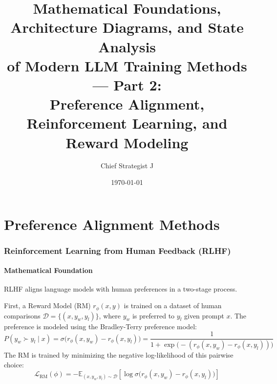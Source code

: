 
\title{\textbf{Mathematical Foundations, Architecture Diagrams, and State Analysis\\
of Modern LLM Training Methods --- Part 2:\\
Preference Alignment, Reinforcement Learning, and Reward Modeling}}
\author{Chief Strategist J}
\date{\today}
\maketitle
\tableofcontents
\newpage

\part{Preference Alignment Methods}

\section{Reinforcement Learning from Human Feedback (RLHF)}

\subsection{Mathematical Foundation}
RLHF aligns language models with human preferences in a two-stage process. 

First, a Reward Model (RM) $r_\phi(x, y)$ is trained on a dataset of human comparisons $\mathcal{D} = \{(x, y_w, y_l)\}$, where $y_w$ is preferred to $y_l$ given prompt $x$. The preference is modeled using the Bradley-Terry preference model:
\begin{equation}
  P(y_w \succ y_l \mid x) = \sigma\bigl( r_\phi(x, y_w) - r_\phi(x, y_l) \bigr) = \frac{1}{1 + \exp\bigl( - (r_\phi(x, y_w) - r_\phi(x, y_l)) \bigr)}
\end{equation}
The RM is trained by minimizing the negative log-likelihood of this pairwise choice:
\begin{equation}
  \mathcal{L}_{\text{RM}}(\phi) = -\mathbb{E}_{(x, y_w, y_l) \sim \mathcal{D}} \left[ \log \sigma \bigl( r_\phi(x, y_w) - r_\phi(x, y_l) \bigr) \right]
\end{equation}

